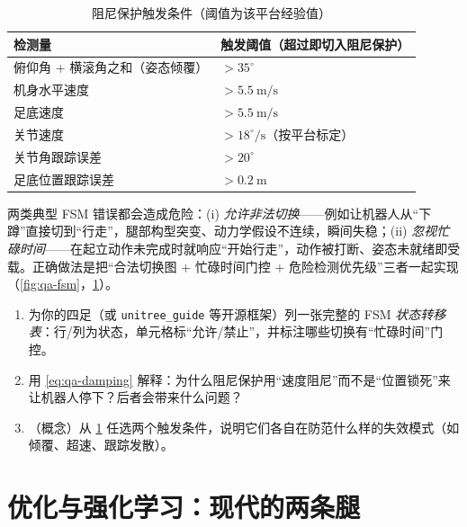 \begin{table}[H]\centering\small
\caption{阻尼保护触发条件\cite{yu2021quadruped}（阈值为该平台经验值）}
\begin{tabular}{ll}
\toprule
检测量 & 触发阈值（超过即切入阻尼保护） \\
\midrule
俯仰角 + 横滚角之和（姿态倾覆） & $>35^\circ$ \\
机身水平速度 & $>5.5\ \text{m/s}$ \\
足底速度 & $>5.5\ \text{m/s}$ \\
关节速度 & $>18^\circ/\text{s}$（按平台标定） \\
关节角跟踪误差 & $>20^\circ$ \\
足底位置跟踪误差 & $>0.2\ \text{m}$ \\
\bottomrule
\end{tabular}
\label{tab:qa-danger}
\end{table}

\begin{pitfall}[误区：忽视忙碌时间或允许非法切换]
两类典型 FSM 错误都会造成危险：(i) \emph{允许非法切换}——例如让机器人从“下蹲”直接切到“行走”，腿部构型突变、动力学假设不连续，瞬间失稳；(ii) \emph{忽视忙碌时间}——在起立动作未完成时就响应“开始行走”，动作被打断、姿态未就绪即受载。正确做法是把“合法切换图 + 忙碌时间门控 + 危险检测优先级”三者一起实现（\cref{fig:qa-fsm}，\cref{tab:qa-danger}）。
\end{pitfall}

\begin{practice}
\begin{enumerate}
  \item 为你的四足（或 \texttt{unitree\_guide} 等开源框架）列一张完整的 FSM \emph{状态转移表}：行/列为状态，单元格标“允许/禁止”，并标注哪些切换有“忙碌时间”门控。
  \item 用 \cref{eq:qa-damping} 解释：为什么阻尼保护用“速度阻尼”而不是“位置锁死”来让机器人停下？后者会带来什么问题？
  \item （概念）从 \cref{tab:qa-danger} 任选两个触发条件，说明它们各自在防范什么样的失效模式（如倾覆、超速、跟踪发散）。
\end{enumerate}
\end{practice}

\section{优化与强化学习：现代的两条腿}
\label{sec:qa-two-streams}

